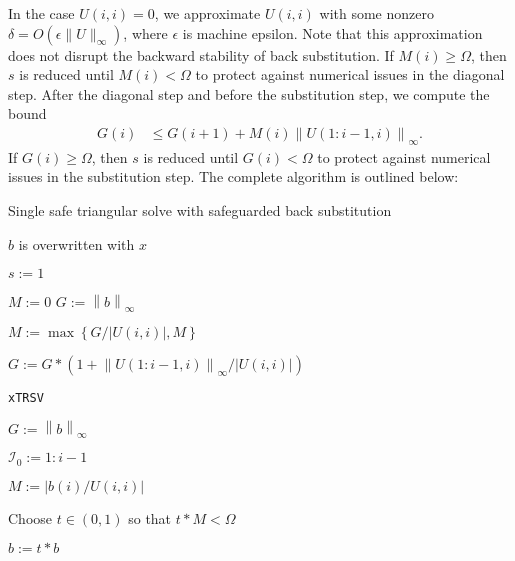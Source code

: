 \documentclass{article}
\begin{document}
In the case \(U(i,i)=0\), we approximate \(U(i,i)\) with some nonzero
\(\delta=O(\epsilon \lVert U\rVert_\infty)\), where \(\epsilon\) is
machine epsilon. Note that this approximation does not disrupt the
backward stability of back substitution.  If \(M(i)\geq \Omega\), then
\(s\) is reduced until \(M(i) < \Omega\) to protect against numerical
issues in the diagonal step. After the diagonal step and before the
substitution step, we compute the bound
\begin{align}
  G(i)
  &\leq G(i+1) + M(i) \left\lVert U(1:i-1,i) \right\rVert_\infty.
\end{align}
If \(G(i)\geq \Omega\), then \(s\) is reduced until \(G(i) < \Omega\)
to protect against numerical issues in the substitution step.  The
complete algorithm is outlined below:
\begin{algorithm}[H]
  \caption{Single safe triangular solve with safeguarded back substitution}
  \label{algorithm:safe trsv}
  \begin{algorithmic}
    
    \Comment \(b\) is overwritten with \(x\)
    
    \State \(s := 1\)
    
    \State \(M := 0\)
    \State \(G := \left\lVert b \right\rVert_\infty \)



    \State \( M := \max\left\lbrace G /\left|U(i,i)\right|, M \right\rbrace\)

    \State \( G := G * \left( 1 + \left\lVert U(1:i-1,i) \right\rVert_\infty/\left| U(i,i) \right| \right) \)

    \EndFor
    

    \State {} \Comment \texttt{xTRSV}

    \Else

    \State \(G := \left\lVert b \right\rVert_\infty\)


    \State \(\mathcal{I}_0 := 1:i-1\)

    \State \(M := \left|{b(i)}/{U(i,i)}\right|\) 


    \State Choose \(t\in\left(0,1\right)\) so that \(t* M< \Omega\)

    \State \(b := t * b\)


\end{algorithmic}
\end{algorithm}
\end{document}
